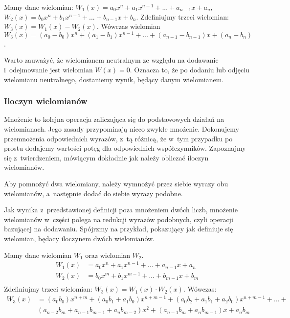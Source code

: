 \begin{example}
	$ $\\
	Mamy dane wielomian: $W_1(x) = a_0x^n + a_1x^{n-1} + ... + a_{n-1}x + a_n$, $W_2(x) = b_0x^n + b_1x^{n-1} + ... + b_{n-1}x + b_n$. Zdefiniujmy trzeci wielomian: $W_3(x) = W_1(x) - W_2(x)$. Wówczas wielomian $W_3(x) = (a_0-b_0)x^n + (a_1-b_1)x^{n-1} + ... + (a_{n-1} - b_{n-1})x + (a_n - b_n)$.
\end{example}

Warto zauważyć, że wielomianem neutralnym ze względu na dodawanie i~odejmowanie jest wielomian $W(x)=0$. Oznacza to, że po dodaniu lub odjęciu wielomianu neutralnego, dostaniemy wynik, będący danym wielomianem.

\subsubsection{Iloczyn wielomianów}

Mnożenie to kolejna operacja zaliczająca się do podstawowych działań na wielomianach. Jego zasady przypominają nieco zwykłe mnożenie. Dokonujemy przemnożenia odpowiednich wyrazów, z~tą różnicą, że w~tym przypadku po prostu dodajemy wartości potęg dla odpowiednich współczynników. Zapoznajmy się z~twierdzeniem, mówiącym dokładnie jak należy obliczać iloczyn wielomianów.

\begin{theorem}
	$ $\\
	Aby pomnożyć dwa wielomiany, należy wymnożyć przez siebie wyrazy obu wielomianów, a~następnie dodać do siebie wyrazy podobne.
\end{theorem}

Jak wynika z~przedstawionej definicji poza mnożeniem dwóch liczb, mnożenie wielomianów w~części polega na redukcji wyrazów podobnych, czyli operacji bazującej na dodawaniu. Spójrzmy na przykład, pokazujący jak definiuje się wielomian, będacy iloczynem dwóch wielomianów.

\begin{example}
	$ $\\
	Mamy dane wielomian $W_1$ oraz wielomian $W_2$.
	\begin{equation*}
	\begin{split}
	W_1(x) &= a_0x^n + a_1x^{n-1} + ... + a_{n-1}x + a_n \\
	W_2(x) &= b_0x^m + b_1x^{m-1} + ... + b_{m-1}x + b_m \\
	\end{split}
	\end{equation*}
	Zdefiniujmy trzeci wielomian: $W_3(x) = W_1(x) \cdot W_2(x)$. Wówczas:
	\begin{equation*}
	\begin{split}
	W_3(x) &= (a_0b_0)x^{n+m} + (a_0b_1+a_1b_0)x^{n+m-1} + (a_0b_2+a_1b_1+a_2b_0)x^{n+m-1} + ... + \\
	&(a_{n-2}b_m + a_{n-1}b_{m-1}+a_nb_{m-2})x^2 + (a_{n-1}b_m + a_nb_{m-1})x + a_nb_m
	\end{split}
	\end{equation*}
\end{example}

